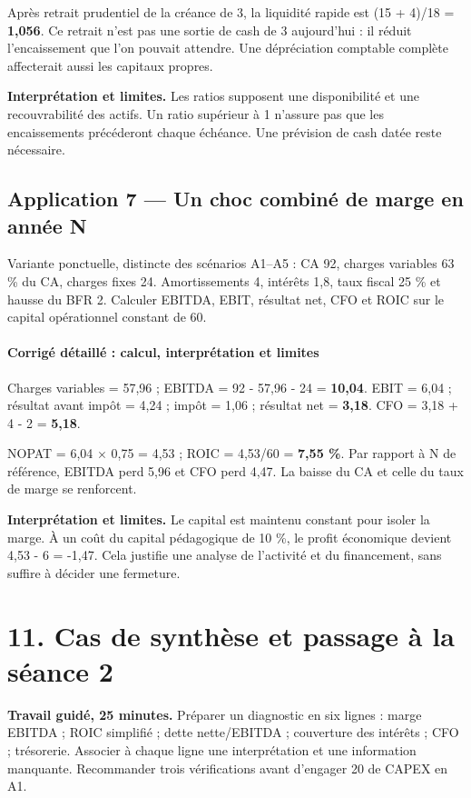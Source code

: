 \documentclass[12pt,a4paper]{article}
\begin{document}
Après retrait prudentiel de la créance de 3, la liquidité rapide est (15 + 4)/18 = \textbf{1,056}. Ce retrait n’est pas une sortie de cash de 3 aujourd’hui : il réduit l’encaissement que l’on pouvait attendre. Une dépréciation comptable complète affecterait aussi les capitaux propres.

\textbf{Interprétation et limites.} Les ratios supposent une disponibilité et une recouvrabilité des actifs. Un ratio supérieur à 1 n’assure pas que les encaissements précéderont chaque échéance. Une prévision de cash datée reste nécessaire.


\subsection*{Application 7 --- Un choc combiné de marge en année N}
Variante ponctuelle, distincte des scénarios A1--A5 : CA 92, charges variables 63 \% du CA, charges fixes 24. Amortissements 4, intérêts 1,8, taux fiscal 25 \% et hausse du BFR 2. Calculer EBITDA, EBIT, résultat net, CFO et ROIC sur le capital opérationnel constant de 60.


\paragraph{Corrigé détaillé : calcul, interprétation et limites}
Charges variables = 57,96 ; EBITDA = 92 - 57,96 - 24 = \textbf{10,04}. EBIT = 6,04 ; résultat avant impôt = 4,24 ; impôt = 1,06 ; résultat net = \textbf{3,18}. CFO = 3,18 + 4 - 2 = \textbf{5,18}.

NOPAT = 6,04 $\times$ 0,75 = 4,53 ; ROIC = 4,53/60 = \textbf{7,55 \%}. Par rapport à N de référence, EBITDA perd 5,96 et CFO perd 4,47. La baisse du CA et celle du taux de marge se renforcent.

\textbf{Interprétation et limites.} Le capital est maintenu constant pour isoler la marge. À un coût du capital pédagogique de 10 \%, le profit économique devient 4,53 - 6 = -1,47. Cela justifie une analyse de l’activité et du financement, sans suffire à décider une fermeture.

\section*{11. Cas de synthèse et passage à la séance 2}
\textbf{Travail guidé, 25 minutes.} Préparer un diagnostic en six lignes : marge EBITDA ; ROIC simplifié ; dette nette/EBITDA ; couverture des intérêts ; CFO ; trésorerie. Associer à chaque ligne une interprétation et une information manquante. Recommander trois vérifications avant d’engager 20 de CAPEX en A1.
\end{document}
